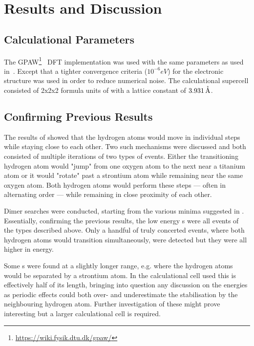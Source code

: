 \section{Results and Discussion}
\label{sec:perovskites-results}

\subsection{Calculational Parameters}
The GPAW\footnote{\url{https://wiki.fysik.dtu.dk/gpaw/}}~\cite{gpaw-review-2010} DFT implementation was used with the same parameters as used in~\cite{double-defect-2011}.
Except that a tighter convergence criteria ($10^{-6} \unit{eV}$) for the electronic structure was used in order to reduce numerical noise.
The calculational supercell consisted of 2x2x2 formula units of  with a lattice constant of $3.931\, \mathrm{\mathring{\mathrm{A}}}$.

\subsection{Confirming Previous Results}
The results of \cite{double-defect-2011} showed that the hydrogen atoms would move in individual steps while staying close to each other.
Two such mechanisms were discussed and both consisted of multiple iterations of two types of events.
Either the transitioning hydrogen atom would "jump" from one oxygen atom to the next near a titanium atom or it would "rotate" past a strontium atom while remaining near the same oxygen atom.
Both hydrogen atoms would perform these steps --- often in alternating order --- while remaining in close proximity of each other.

Dimer  searches were conducted, starting from the various minima suggested in \cite{double-defect-2011}.
Essentially, confirming the previous results, the low energy s were all events of the types described above.
Only a handful of truly concerted events, where both hydrogen atoms would transition simultaneously, were detected but they were all higher in energy.

Some s were found at a slightly longer range, e.g. where the hydrogen atoms would be separated by a strontium atom.
In the calculational cell used this is effectively half of its length, bringing into question any discussion on the energies as periodic effects could both over- and underestimate the stabilisation by the neighbouring hydrogen atom.
Further investigation of these might prove interesting but a larger calculational cell is required.


